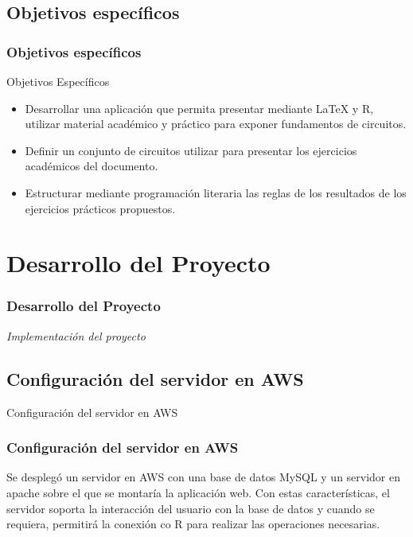 \documentclass[11pt]{beamer}					%
\begin{document}
				\subsection{Objetivos específicos}			
		 \begin{frame}[fragile]						%
			\frametitle{Objetivos específicos}
			
			\begin{block}{Objetivos Específicos}

\begin{itemize}
\item Desarrollar una aplicación  que permita presentar mediante LaTeX y R, utilizar material académico y práctico para exponer fundamentos de circuitos.
\end{itemize}
\begin{itemize}
\item Definir un conjunto de circuitos utilizar para presentar los ejercicios académicos del documento.
\end{itemize}
\begin{itemize}
\item Estructurar mediante programación literaria las reglas de los resultados de los ejercicios prácticos propuestos.
\end{itemize}	

\end{block}
		\end{frame}
		
	\section{Desarrollo del Proyecto}	
		 \begin{frame}[fragile]
			\frametitle{Desarrollo del Proyecto}
			\begin{huge}
			\begin{center}
				\emph{\textit{Implementación del proyecto}}
			\end{center}
			\end{huge}
		\end{frame}		
		\subsection{Configuración del servidor en AWS}	
		 \begin{frame}[fragile]	
		 \begin{block}{Configuración del servidor en AWS}
		 \frametitle{Configuración del servidor en AWS}
		Se desplegó un servidor en AWS con una base de datos MySQL y un servidor en apache sobre el que se montaría la aplicación web. Con estas características, el servidor
soporta la interacción del usuario con la base de datos y cuando se requiera, permitirá la conexión co R para realizar las operaciones necesarias.

 \end{block}
		
		\end{frame}
		
\end{document}
